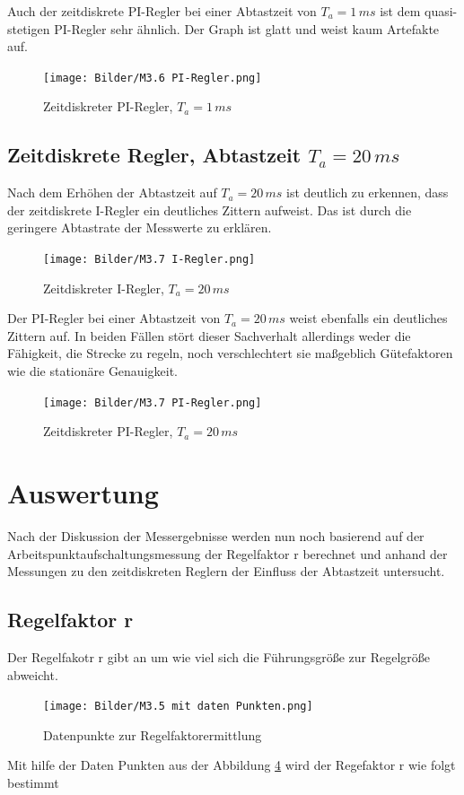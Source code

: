 \documentclass{report}
\begin{document}
Auch der zeitdiskrete PI-Regler bei einer Abtastzeit von $T_a=1\,ms$ ist dem quasi-stetigen PI-Regler sehr ähnlich. Der Graph ist glatt und weist kaum Artefakte auf.

\begin{figure}[!ht]
	\centering
	\texttt{[image: Bilder/M3.6 PI-Regler.png]}
	\caption{Zeitdiskreter PI-Regler, $T_a=1\,ms$}
	\label{fig:m36piregler}
\end{figure}


\subsection{Zeitdiskrete Regler, Abtastzeit $T_a=20\,ms$}

Nach dem Erhöhen der Abtastzeit auf $T_{a} = 20\,ms$ ist deutlich zu erkennen, dass der zeitdiskrete I-Regler ein deutliches Zittern aufweist. Das ist durch die geringere Abtastrate der Messwerte zu erklären.

\begin{figure}[!ht]
	\centering
	\texttt{[image: Bilder/M3.7 I-Regler.png]}
	\caption{Zeitdiskreter I-Regler, $T_a=20\,ms$}
	\label{fig:M3.7 I-Regler png}
\end{figure}

Der PI-Regler bei einer Abtastzeit von $T_a=20\,ms$ weist ebenfalls ein deutliches Zittern auf. In beiden Fällen stört dieser Sachverhalt allerdings weder die Fähigkeit, die Strecke zu regeln, noch verschlechtert sie maßgeblich Gütefaktoren wie die stationäre Genauigkeit.

\begin{figure}[!ht]
	\centering
	\texttt{[image: Bilder/M3.7 PI-Regler.png]}
	\caption{Zeitdiskreter PI-Regler, $T_a=20\,ms$}
	\label{fig:M3.7 PI-Regler png}
\end{figure}



\newpage

\section{Auswertung}

\textmd{Nach der Diskussion der Messergebnisse werden nun noch basierend auf der Arbeitspunktaufschaltungsmessung der Regelfaktor r berechnet und anhand der Messungen zu den zeitdiskreten Reglern der Einfluss der Abtastzeit untersucht.}%

\subsection{Regelfaktor r}
\textmd{Der Regelfakotr r gibt an um wie viel sich die Führungsgröße zur Regelgröße abweicht.}
\begin{figure}[H]
	\centering
	\texttt{[image: Bilder/M3.5 mit daten Punkten.png]}
	\caption{Datenpunkte zur Regelfaktorermittlung}
	\label{fig:M3.5 mit daten Punkten png}
\end{figure}
\textmd{Mit hilfe der Daten Punkten aus der Abbildung \ref{fig:M3.5 mit daten Punkten png} wird der Regefaktor r wie folgt bestimmt}
\end{document}
